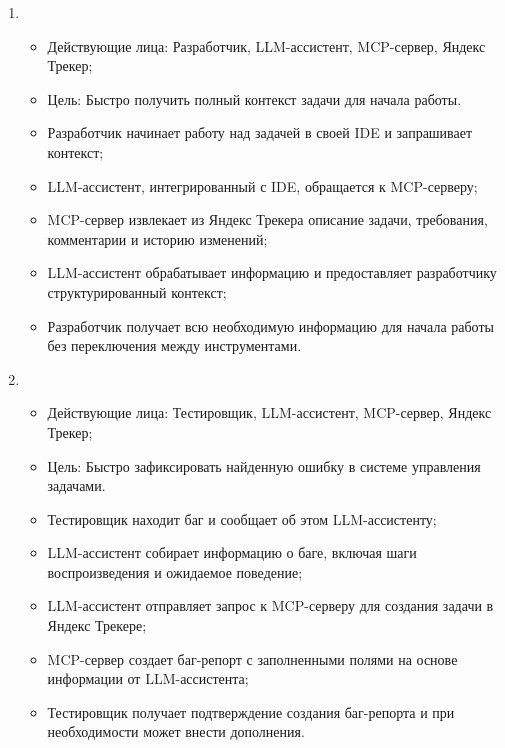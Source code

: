 \documentclass[utf8, russian]{eskdtext}
\begin{document}
\begin{enumerate}
    \item {}\\
    \begin{itemize}
        \item Действующие лица: Разработчик, LLM-ассистент, MCP-сервер, Яндекс Трекер;
        \item Цель: Быстро получить полный контекст задачи для начала работы.
    \end{itemize}
    \begin{itemize}
        \item Разработчик начинает работу над задачей в своей IDE и запрашивает контекст;
        \item LLM-ассистент, интегрированный с IDE, обращается к MCP-серверу;
        \item MCP-сервер извлекает из Яндекс Трекера описание задачи, требования, комментарии и историю изменений;
        \item LLM-ассистент обрабатывает информацию и предоставляет разработчику структурированный контекст;
        \item Разработчик получает всю необходимую информацию для начала работы без переключения между инструментами.
    \end{itemize}

    \item {}\\
    \begin{itemize}
        \item Действующие лица: Тестировщик, LLM-ассистент, MCP-сервер, Яндекс Трекер;
        \item Цель: Быстро зафиксировать найденную ошибку в системе управления задачами.
    \end{itemize}
    \begin{itemize}
        \item Тестировщик находит баг и сообщает об этом LLM-ассистенту;
        \item LLM-ассистент собирает информацию о баге, включая шаги воспроизведения и ожидаемое поведение;
        \item LLM-ассистент отправляет запрос к MCP-серверу для создания задачи в Яндекс Трекере;
        \item MCP-сервер создает баг-репорт с заполненными полями на основе информации от LLM-ассистента;
        \item Тестировщик получает подтверждение создания баг-репорта и при необходимости может внести дополнения.
    \end{itemize}
\end{enumerate}
\end{document}
